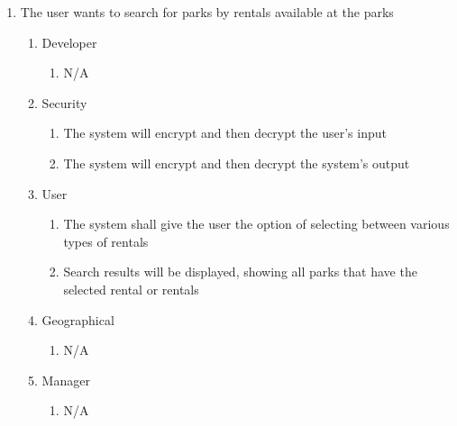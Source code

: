 \documentclass[titlepage]{article}
\begin{document}
\begin{enumerate}[{BE}1.]
    \item The user wants to search for parks by rentals available at the parks
    \begin{enumerate}[{VP\theenumi}.1]
        \item Developer
            \begin{enumerate}
                \item N/A
            \end{enumerate}
        \item Security
            \begin{enumerate}
                \item The system will encrypt and then decrypt the user's input
                \item The system will encrypt and then decrypt the system's output
            \end{enumerate}
        \item User
            \begin{enumerate}
                \item The system shall give the user the option of selecting between various types
                of rentals
                \item Search results will be displayed, showing all parks that have the selected
                rental or rentals
            \end{enumerate}
        \item Geographical
            \begin{enumerate}
                \item N/A
            \end{enumerate}
        \item Manager
            \begin{enumerate}
                \item N/A
            \end{enumerate}
    \end{enumerate}


\end{enumerate}
\end{document}

